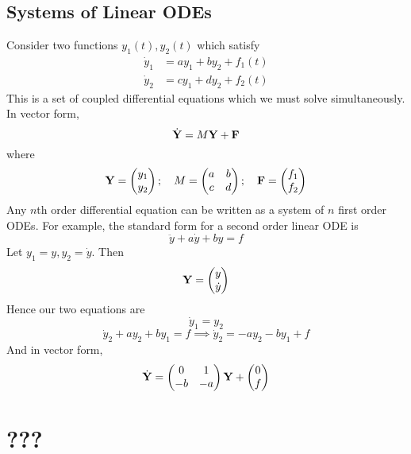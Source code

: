 \documentclass{article}
\begin{document}
\subsection{Systems of Linear ODEs}
Consider two functions $y_1(t), y_2(t)$ which satisfy
\begin{align*}
    \dot y_1 & = ay_1 + by_2 + f_1(t) \\
    \dot y_2 & = cy_1 + dy_2 + f_2(t)
\end{align*}
This is a set of coupled differential equations which we must solve simultaneously. In vector form,
\[ \dot{\vb Y} = M\vb Y + \vb F \]
where
\[ \vb Y = \begin{pmatrix}
        y_1 \\ y_2
    \end{pmatrix};\quad M = \begin{pmatrix}
        a & b \\ c & d
    \end{pmatrix};\quad \vb F = \begin{pmatrix}
        f_1 \\ f_2
    \end{pmatrix} \]
Any $n$th order differential equation can be written as a system of $n$ first order ODEs. For example, the standard form for a second order linear ODE is
\[ \ddot y + a\dot y + by = f \]
Let $y_1 = y, y_2 = \dot y$. Then
\[ \vb Y = \begin{pmatrix}
        y \\ \dot y
    \end{pmatrix} \]
Hence our two equations are
\[ \dot y_1 = y_2 \]
\[ \dot y_2 + ay_2 + by_1 = f \implies \dot y_2 = -ay_2 - by_1 + f \]
And in vector form,
\[ \dot{\vb Y} = \begin{pmatrix}
        0  & 1  \\
        -b & -a
    \end{pmatrix} \vb Y + \begin{pmatrix}
        0 \\ f
    \end{pmatrix} \]

\section{???}
\end{document}
